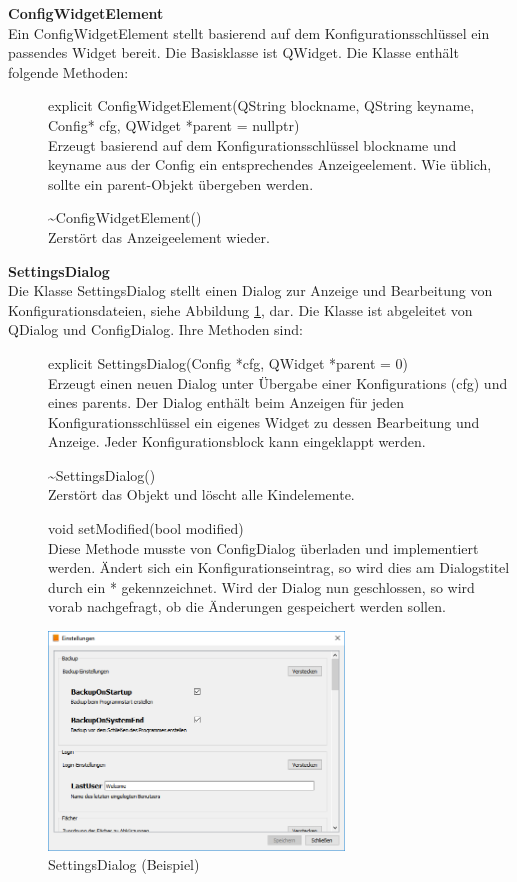 \textbf{ConfigWidgetElement}\\
Ein ConfigWidgetElement stellt basierend auf dem Konfigurationsschlüssel ein passendes Widget bereit. Die Basisklasse ist QWidget. Die Klasse enthält folgende Methoden:
\begin{description}
	\item[ ] explicit ConfigWidgetElement(QString blockname, QString keyname, Config* cfg, QWidget *parent = nullptr)\\
	Erzeugt basierend auf dem Konfigurationsschlüssel blockname und keyname aus der Config ein entsprechendes Anzeigeelement. Wie üblich, sollte ein parent-Objekt übergeben werden.
   \item[ ] \~{}ConfigWidgetElement()\\
	  Zerstört das Anzeigeelement wieder.
\end{description}

\textbf{SettingsDialog}\\
Die Klasse SettingsDialog stellt einen Dialog zur Anzeige und Bearbeitung von Konfigurationsdateien, siehe Abbildung \ref{fig:SettingsDialog}, dar. Die Klasse ist abgeleitet von QDialog und ConfigDialog. Ihre Methoden sind:
\begin{description}
	\item[ ] explicit SettingsDialog(Config *cfg, QWidget *parent = 0)\\
	Erzeugt einen neuen Dialog unter Übergabe einer Konfigurations (cfg) und eines parents. Der Dialog enthält beim Anzeigen für jeden Konfigurationsschlüssel ein eigenes Widget zu dessen Bearbeitung und Anzeige. Jeder Konfigurationsblock kann eingeklappt werden.
	\item[ ] \~{}SettingsDialog()\\
	Zerstört das Objekt und löscht alle Kindelemente.
	\item[ ] void setModified(bool modified)\\
	Diese Methode musste von ConfigDialog überladen und implementiert werden. Ändert sich ein Konfigurationseintrag, so wird dies am Dialogstitel durch ein * gekennzeichnet. Wird der Dialog nun geschlossen, so wird vorab nachgefragt, ob die Änderungen gespeichert werden sollen.
\end{description}
\begin{figure}[htb]
	\centering
		\includegraphics[width=0.70\textwidth]{figures/SettingsDialog.png}
	\caption{SettingsDialog (Beispiel)}
	\label{fig:SettingsDialog}
\end{figure}

